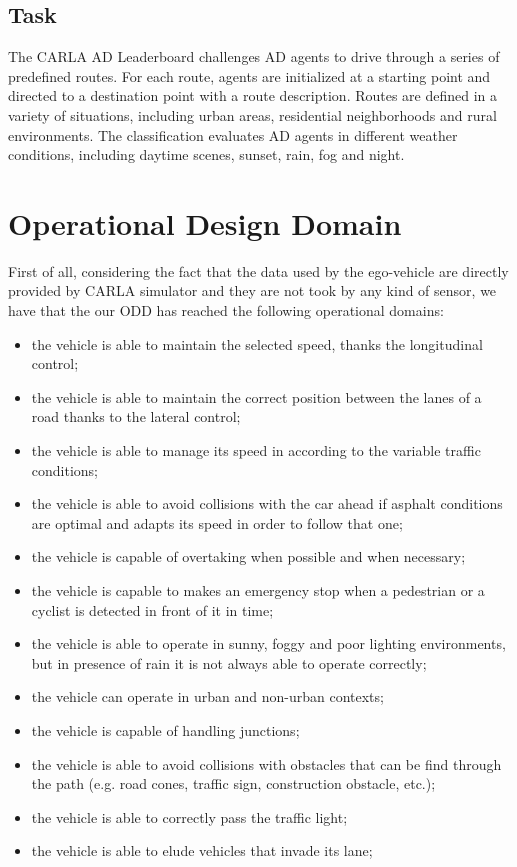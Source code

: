 \documentclass{article}
\begin{document}
\subsection{Task}
The CARLA AD Leaderboard challenges AD agents to drive through a series of predefined routes. For each route, 
agents are initialized at a starting point and directed to a destination point with a route description. 
Routes are defined in a variety of situations, including urban areas, residential neighborhoods and rural environments. 
The classification evaluates AD agents in different weather conditions, including daytime scenes, sunset, rain, fog and night.

\section{Operational Design Domain}
First of all, considering the fact that the data used by the ego-vehicle are directly provided by CARLA simulator and they are not took by any kind of sensor, we have 
that the our ODD has reached the following operational domains:
\begin{itemize}
    \item the vehicle is able to maintain the selected speed, thanks the longitudinal control;
    \item the vehicle is able to maintain the correct position between the lanes of a road thanks to the lateral control;
    \item the vehicle is able to manage its speed in according to the variable traffic conditions;
    \item the vehicle is able to avoid collisions with the car ahead if asphalt conditions are optimal and adapts its speed in order to follow that one;
    \item the vehicle is capable of overtaking when possible and when necessary;
    \item the vehicle is capable to makes an emergency stop when a pedestrian or a cyclist is detected in front of it in time;
    \item the vehicle is able to operate in sunny, foggy and poor lighting environments, but in presence of rain it is not always able to operate correctly;
    \item the vehicle can operate in urban and non-urban contexts;
    \item the vehicle is capable of handling junctions;
    \item the vehicle is able to avoid collisions with obstacles that can be find through the path (e.g. road cones, traffic sign, construction obstacle, etc.);
    \item the vehicle is able to correctly pass the traffic light;
    \item the vehicle is able to elude vehicles that invade its lane;
\end{itemize}
\end{document}
